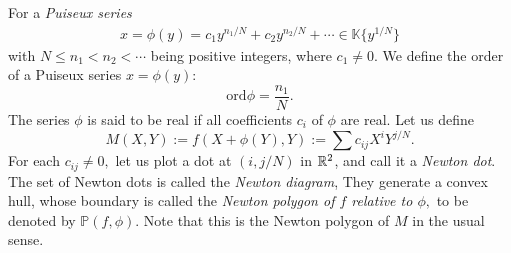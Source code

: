 \documentclass[reqno, 12pt ,a4letter]{amsart}
\theoremstyle{definition}
\begin{document}
For a {\em Puiseux series}
\begin{eqnarray*}
	x = \phi(y) = c_1y^{n_1/N} + c_2y^{n_2/N}+ \cdots \in \mathbb{K}\{y^{1/N}\}
\end{eqnarray*}
with $N \le n_1 < n_2 < \cdots $ being positive integers, where $c_1 \ne 0$. We define the order of a Puiseux series $x=\phi(y)$:
$$ \mathrm{ord}\phi = \frac{n_1}{N}. $$
The series $\phi$ is said to be real if all coefficients $c_i$ of $\phi$ are real. Let us define 
$$M(X, Y) := f(X + \phi(Y), Y) := \sum c_{ij}X^iY^{j/N}.$$
For each  $c_{ij} \ne 0,$ let us plot a dot at $(i, j/N)$ in $\Bbb R^2$, and call it a {\em Newton dot}. The set of Newton dots is called the {\em Newton diagram}, They generate a convex hull, whose boundary is called the {\em Newton polygon of $f$ relative to $\phi,$}  to be denoted by $\mathbb{P}(f, \phi).$ Note that this is the Newton polygon of $M$ in the usual sense.
\end{document}
